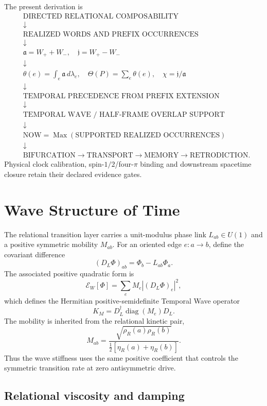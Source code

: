 \documentclass[11pt]{book}
\begin{document}
The present derivation is
\[
\boxed{
\begin{aligned}
&\text{DIRECTED RELATIONAL COMPOSABILITY}\\
&\downarrow\\
&\text{REALIZED WORDS AND PREFIX OCCURRENCES}\\
&\downarrow\\
&\mathfrak a=W_++W_-,\quad \mathfrak j=W_+-W_-\\
&\downarrow\\
&\theta(e)=\int_e\mathfrak a\,d\lambda_e,\quad
\Theta(P)=\sum_e\theta(e),\quad
\chi=\mathfrak j/\mathfrak a\\
&\downarrow\\
&\text{TEMPORAL PRECEDENCE FROM PREFIX EXTENSION}\\
&\downarrow\\
&\text{TEMPORAL WAVE / HALF-FRAME OVERLAP SUPPORT}\\
&\downarrow\\
&\text{NOW}=\operatorname{Max}(\text{SUPPORTED REALIZED OCCURRENCES})\\
&\downarrow\\
&\text{BIFURCATION}\to\text{TRANSPORT}\to\text{MEMORY}\to\text{RETRODICTION}.
\end{aligned}
}
\]
Physical clock calibration, spin-$1/2$/four-$\pi$ binding and downstream spacetime closure retain their declared evidence gates.

\chapter{Wave Structure of Time}

The relational transition layer carries a unit-modulus phase link $L_{ab}\in U(1)$ and a positive symmetric mobility $M_{ab}$.  For an oriented edge $e:a\to b$, define the covariant difference
\[
(D_L\Phi)_{ab}=\Phi_b-L_{ab}\Phi_a.
\]
The associated positive quadratic form is
\[
\mathcal E_W[\Phi]
=\sum_e M_e |(D_L\Phi)_e|^2,
\]
which defines the Hermitian positive-semidefinite Temporal Wave operator
\[
\boxed{
K_M=D_L^\dagger\operatorname{diag}(M_e)D_L.
}
\]
The mobility is inherited from the relational kinetic pair,
\[
M_{ab}
=\frac{\sqrt{\rho_R(a)\rho_R(b)}}{\tfrac12[\eta_R(a)+\eta_R(b)]}.
\]
Thus the wave stiffness uses the same positive coefficient that controls the symmetric transition rate at zero antisymmetric drive.

\section{Relational viscosity and damping}
\end{document}

